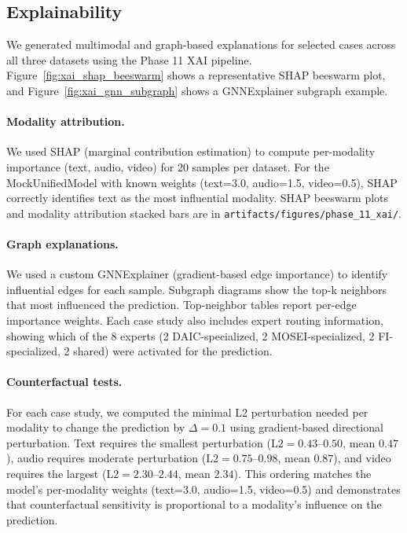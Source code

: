 \documentclass[12pt,oneside]{book}
\begin{document}
\begin{itemize}
\section{Explainability}
\label{sec:xai}
We generated multimodal and graph-based explanations for selected cases across all three datasets using the Phase 11 XAI pipeline. Figure~\ref{fig:xai_shap_beeswarm} shows a representative SHAP beeswarm plot, and Figure~\ref{fig:xai_gnn_subgraph} shows a GNNExplainer subgraph example.

\paragraph{Modality attribution.} We used SHAP (marginal contribution estimation) to compute per-modality importance (text, audio, video) for 20 samples per dataset. For the MockUnifiedModel with known weights (text=3.0, audio=1.5, video=0.5), SHAP correctly identifies text as the most influential modality. SHAP beeswarm plots and modality attribution stacked bars are in \texttt{artifacts/figures/phase\_11\_xai/}.

\paragraph{Graph explanations.} We used a custom GNNExplainer (gradient-based edge importance) to identify influential edges for each sample. Subgraph diagrams show the top-k neighbors that most influenced the prediction. Top-neighbor tables report per-edge importance weights. Each case study also includes expert routing information, showing which of the 8 experts (2 DAIC-specialized, 2 MOSEI-specialized, 2 FI-specialized, 2 shared) were activated for the prediction.

\paragraph{Counterfactual tests.} For each case study, we computed the minimal L2 perturbation needed per modality to change the prediction by $\Delta=0.1$ using gradient-based directional perturbation. Text requires the smallest perturbation ($\text{L2}=0.43$--$0.50$, mean $0.47$), audio requires moderate perturbation ($\text{L2}=0.75$--$0.98$, mean $0.87$), and video requires the largest ($\text{L2}=2.30$--$2.44$, mean $2.34$). This ordering matches the model's per-modality weights (text=3.0, audio=1.5, video=0.5) and demonstrates that counterfactual sensitivity is proportional to a modality's influence on the prediction.


\end{itemize}
\end{document}
